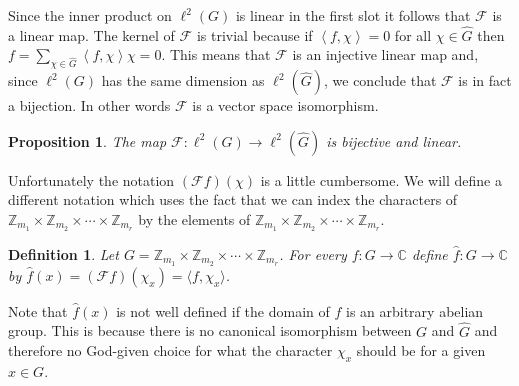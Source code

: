 \documentclass[12pt]{article}
\newtheorem{Definition}{Definition}
\newtheorem{Proposition}{Proposition}
\newcommand{\Z}{\mathbb{Z}}
\newcommand{\C}{\mathbb{C}}
\newcommand{\Zm}{\Z_{m_1}\times \Z_{m_2} \times \cdots \times \Z_{m_r}}
\begin{document}
Since the inner product on $\ell^2(G)$ is linear in the first slot it follows that $\mathscr{F}$ is a linear map.
The kernel of $\mathscr{F}$ is trivial because if $\left< f, \chi \right> = 0$ for all $\chi\in \widehat{G}$ then $f = \sum_{\chi\in\widehat{G}} \left< f, \chi \right>  \chi= 0$.
This means that $\mathscr{F}$ is an injective linear map and, since $\ell^2(G)$ has the same dimension as $\ell^2(\widehat{G})$, we conclude that $\mathscr{F}$ is in fact a bijection.
In other words $\mathscr{F}$ is a vector space isomorphism.

\begin{Proposition} \label{linear} %
    The map $\mathscr{F}:\ell^2(G) \to \ell^2(\widehat{G})$ is bijective and linear.
\end{Proposition}




Unfortunately the notation $(\mathscr{F}f)(\chi)$ is a little cumbersome.
We will define a different notation which uses the fact that we can index the characters of $\Zm$ by the elements of $\Zm$.



\begin{Definition} %
    Let $G = \Zm$.
    For every $f:G\to \C$ define $\widehat{f}: G\to \C$ by $\widehat{f}(x) = (\mathscr{F} f )(\chi_x) = \langle f, \chi_x\rangle$.
\end{Definition}

Note that $\widehat{f}(x)$ is not well defined if the domain of $f$ is an arbitrary abelian group.
This is because there is no canonical isomorphism between $G$ and $\widehat{G}$ and therefore no God-given choice for what the character $\chi_x$  should be for a given $x\in G$.
\end{document}
